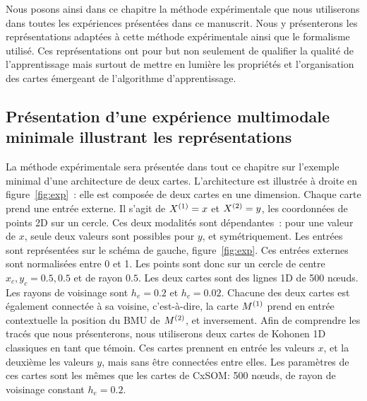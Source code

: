 \documentclass[../main]{subfiles}
\begin{document}
Nous posons ainsi dans ce chapitre la méthode expérimentale que nous utiliserons dans toutes les expériences présentées dans ce manuscrit. 
Nous y présenterons les représentations adaptées à cette méthode expérimentale ainsi que le formalisme utilisé.
Ces représentations ont pour but non seulement de qualifier la qualité de l'apprentissage mais surtout de mettre en lumière les propriétés et l'organisation des cartes émergeant de l'algorithme d'apprentissage. 

\subsection{Présentation d'une expérience multimodale minimale illustrant les représentations}

La méthode expérimentale sera présentée dans tout ce chapitre sur l'exemple minimal d'une architecture de deux cartes. L'architecture est illustrée à droite en figure~\ref{fig:exp}~: elle est composée de deux cartes en une dimension. Chaque carte prend une entrée externe. Il s'agit de $X^{({1})}=x$ et $X^{({2})}=y$, les coordonnées de points 2D sur un cercle. Ces deux modalités sont dépendantes~: pour une valeur de $x$, seule deux valeurs sont possibles pour $y$, et symétriquement. Les entrées sont représentées sur le schéma de gauche, figure~\ref{fig:exp}.
Ces entrées externes sont normalisées entre 0 et 1. Les points sont donc sur un cercle de centre $x_c,y_c = 0.5,0.5$ et de rayon $0.5$.
Les deux cartes sont des lignes 1D de 500 n\oe{}uds. Les rayons de voisinage sont $h_e = 0.2$ et $h_c = 0.02$.
Chacune des deux cartes est également connectée à sa voisine, c'est-à-dire, la carte $M^{({1})}$ prend en entrée contextuelle la position du BMU de $M^{({2})}$, et inversement.
Afin de comprendre les tracés que nous présenterons, nous utiliserons deux cartes de Kohonen 1D classiques en tant que témoin.
Ces cartes prennent en entrée les valeurs $x$, et la deuxième les valeurs $y$, mais sans être connectées entre elles. Les paramètres de ces cartes sont les mêmes que les cartes de CxSOM: 500 n\oe{}uds, de rayon de voisinage constant $h_e = 0.2$.
\end{document}
